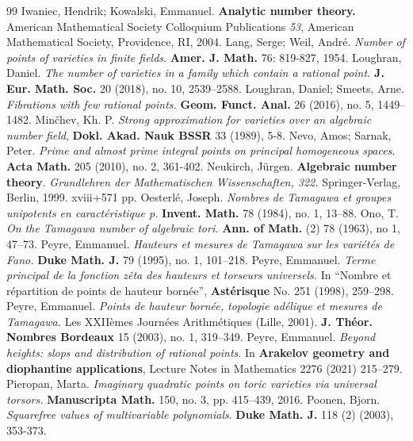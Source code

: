 \begin{thebibliography}{99}
	Iwaniec, Hendrik;  Kowalski, Emmanuel. \textbf{Analytic number theory.} American Mathematical Society Colloquium Publications {\em 53}, American Mathematical Society, Providence, RI, 2004.
	 Lang, Serge; Weil, Andr\'e. \emph{Number of points of varieties in finite fields}. \textbf{Amer. J. Math.} 76: 819-827, 1954.
	 Loughran, Daniel. \emph{The number of varieties in a family which contain a rational point.} \textbf{J. Eur. Math. Soc.} 20 (2018), no. 10, 2539--2588.
	 Loughran, Daniel; Smeets, Arne. \emph{Fibrations with few rational points.} \textbf{Geom. Funct. Anal. } 26 (2016), no. 5, 1449--1482.
	 Min\v{c}hev, Kh. P. \emph{Strong approximation for varieties over an algebraic number field}, \textbf{Dokl. Akad. Nauk BSSR} 33 (1989), 5-8.
	 Nevo, Amos; Sarnak, Peter. \emph{Prime and almost prime integral points on principal homogeneous spaces}. \textbf{Acta Math.} 205 (2010), no. 2, 361-402.  
	Neukirch, Jürgen. \textbf{Algebraic number theory}. \emph{Grundlehren der Mathematischen Wissenschaften, 322.} Springer-Verlag, Berlin, 1999. xviii+571 pp. 
	 Oesterlé, Joseph. \emph{Nombres de Tamagawa et groupes unipotents en caractéristique p.} \textbf{Invent. Math.} 78 (1984), no. 1, 13--88. 
	 Ono, T. \emph{On the Tamagawa number of algebraic tori.} \textbf{Ann. of Math.} (2) 78 (1963), no 1, 47--73.
	 Peyre, Emmanuel. \emph{Hauteurs et mesures de Tamagawa sur les variétés de Fano.} \textbf{Duke Math. J.} 79 (1995), no. 1, 101--218.
	 Peyre, Emmanuel. \emph{Terme principal de la fonction zêta des hauteurs et torseurs universels.} In ``Nombre et répartition de points de hauteur bornée'', \textbf{Astérisque} No. 251 (1998), 259--298. 
	 Peyre, Emmanuel. \emph{Points de hauteur bornée, topologie adélique et mesures de Tamagawa.} Les XXIIèmes Journées Arithm\'etiques (Lille, 2001). \textbf{J. Théor. Nombres Bordeaux} 15 (2003), no. 1, 319--349. 
	 Peyre, Emmanuel. \emph{Beyond heights: slops and distribution of rational points}. In \textbf{Arakelov geometry and diophantine applications}, Lecture Notes in Mathematics 2276 (2021) 215--279.
	 Pieropan, Marta. \emph{Imaginary quadratic points on toric varieties via universal torsors.} \textbf{Manuscripta Math.} 150, no. 3, pp. 415--439, 2016.
	  Poonen,  Bjorn. \emph{Squarefree values of multivariable polynomials}. \textbf{Duke Math. J.} 118 (2) (2003), 353-373.

\end{thebibliography}
